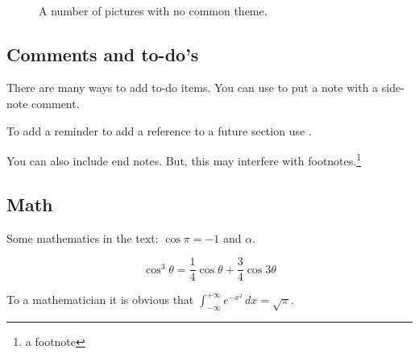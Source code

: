 \lipsum[5-8] %

\begin{figure}[tb]
\centering
{} \quad
{} \\
 \quad
{}
\caption[A number of pictures.]{A number of pictures with no common theme.} %
\label{fig:esempio}
\end{figure}

\subsection{Comments and to-do's}
There are many ways to add to-do items.
You can use  to put a note with a side-note comment.

To add a reminder to add a reference to a future section use
.

\begin{comment}
Everything inside this section will be ignore.
The comment package can also support generic comment environment, and conditional comments.
\end{comment}

You can also include end notes. 
But, this may interfere with footnotes.\footnote{a footnote}

\subsection{Math}

Some mathematics in the text: $\cos\pi=-1$ and $\alpha$.

\begin{equation}
\cos^3 \theta =\frac{1}{4}\cos\theta+\frac{3}{4}\cos 3\theta
\label{eq:refname2}
\end{equation}

\lipsum[5] %

\begin{definition}[Gauss]
To a mathematician it is obvious that
$\int_{-\infty}^{+\infty}
e^{-x^2}\,dx=\sqrt{\pi}$.
\end{definition}

